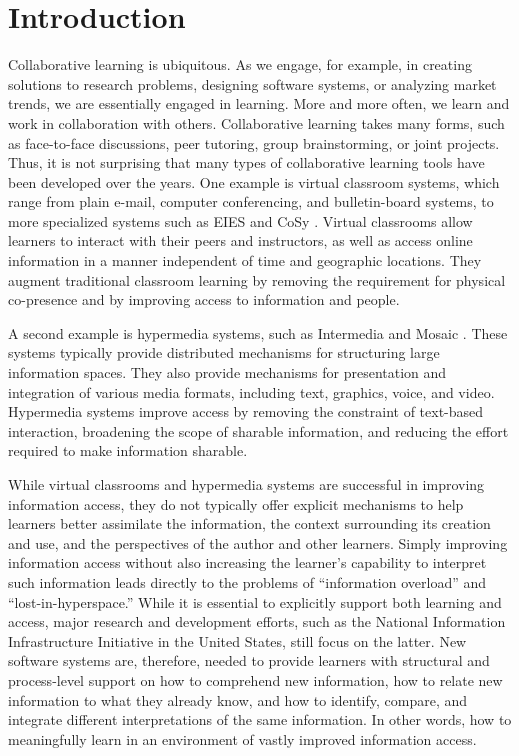 \thispagestyle{empty}

\newpage
\thispagestyle{empty}
\tableofcontents
\newpage
{}


\section{Introduction} 
\label{sec:introduction}

Collaborative learning is ubiquitous. As we engage, for example, in
creating solutions to research problems, designing software systems, or
analyzing market trends, we are essentially engaged in learning. More and
more often, we learn and work in collaboration with others. Collaborative
learning takes many forms, such as face-to-face discussions, peer tutoring,
group brainstorming, or joint projects. Thus, it is not surprising that
many types of collaborative learning tools have been developed over the
years. One
example is virtual classroom systems, which range from plain e-mail,
computer conferencing, and bulletin-board systems, to more specialized
systems such as EIES \cite{Hiltz88} and CoSy \cite{Mason89}. Virtual
classrooms allow learners to interact with their peers and instructors, as
well as access online information in a manner independent of time and
geographic locations. They augment traditional classroom learning by
removing the requirement for physical co-presence and by improving access
to information and people.

A second example is hypermedia systems, such as Intermedia
\cite{Yankelovich88} and Mosaic \cite{Andreessen93}. These systems
typically provide distributed mechanisms for structuring large information
spaces. They also provide mechanisms for presentation and integration of
various media formats, including text, graphics, voice, and video.
Hypermedia systems improve access by removing the constraint of text-based
interaction, broadening the scope of sharable information, and reducing the
effort required to make information sharable.

While virtual classrooms and hypermedia systems are successful in improving
information access, they do not typically offer explicit mechanisms to help
learners better assimilate the information, the context surrounding its
creation and use, and the perspectives of the author and other
learners. Simply improving information access without also
increasing the learner's capability to interpret such information leads
directly to the problems of ``information overload'' and
``lost-in-hyperspace.'' While it is essential to explicitly support both
learning and access, major research and development efforts, such as the
National Information Infrastructure Initiative in the United States, still
focus on the latter. New software systems are, therefore, needed to provide
learners with structural and process-level support on how to comprehend new
information, how to relate new information to what they already know, and
how to identify, compare, and integrate different interpretations of the
same information. In other words, how to meaningfully learn in an
environment of vastly improved information access.

